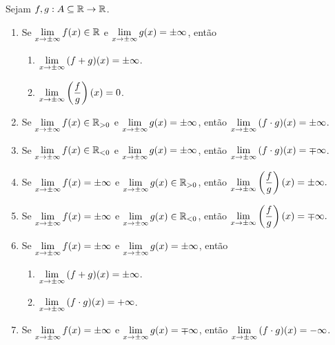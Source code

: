 \begin{proposition}
    Sejam $f,g : A \subseteq \mathbb{R} \to \mathbb{R}$.
        \begin{enumerate}[leftmargin=*, align=left, label=\textbf{(\alph*)}]
            \item Se $\displaystyle \lim_{x \to \pm \infty} f(x) \in \mathbb{R}$ e $\displaystyle \lim_{x \to \pm \infty} g(x) = \pm \infty$, então
                \begin{enumerate}[label=\roman*.]
                    \item $\displaystyle \lim_{x \to \pm \infty} \, (f+g)(x) = \pm \infty$.
                    \item $\displaystyle \lim_{x \to \pm \infty} \left(\dfrac{f}{g} \right)(x) = 0$.
                \end{enumerate}
            \item Se $\displaystyle \lim_{x \to \pm \infty} f(x) \in \mathbb{R}_{>0}$ e $\displaystyle \lim_{x \to \pm \infty} g(x) = \pm \infty$, então $\displaystyle \lim_{x \to \pm \infty} \, (f \cdot g)(x) = \pm \infty$.
            \item Se $\displaystyle \lim_{x \to \pm \infty} f(x) \in \mathbb{R}_{<0}$ e $\displaystyle \lim_{x \to \pm \infty} g(x) = \pm \infty$, então $\displaystyle \lim_{x \to \pm \infty} \, (f \cdot g)(x) = \mp \infty$.
            \item Se $\displaystyle \lim_{x \to \pm \infty} f(x)=\pm\infty$ e $\displaystyle \lim_{x \to \pm \infty} g(x)\in\mathbb{R}_{>0}$, então
                $\displaystyle
                    \lim_{x\to \pm \infty}\left(\frac{f}{g}\right)(x)=\pm\infty.
                $
            \item Se $\displaystyle \lim_{x \to \pm \infty} f(x)=\pm\infty$ e $\displaystyle \lim_{x \to \pm \infty} g(x)\in\mathbb{R}_{<0}$, então
                $\displaystyle
                    \lim_{x\to \pm \infty}\left(\frac{f}{g}\right)(x)=\mp\infty.
                $
            \item Se $\displaystyle \lim_{x \to \pm \infty} f(x) = \pm \infty$ e $\displaystyle \lim_{x \to \pm \infty} g(x) = \pm \infty$, então
                \begin{enumerate}[label=\roman*.]
                    \item $\displaystyle \lim_{x \to \pm \infty} \, (f+g)(x) = \pm \infty$.
                    \item $\displaystyle \lim_{x \to \pm \infty} \, (f \cdot g)(x) = + \infty$.
                \end{enumerate}
            \item Se $\displaystyle \lim_{x \to \pm \infty} f(x) = \pm \infty$ e $\displaystyle \lim_{x \to \pm \infty} g(x) = \mp \infty$, então $\displaystyle \lim_{x \to \pm \infty} \, (f \cdot g)(x) = - \infty$.
        \end{enumerate}
\end{proposition}

